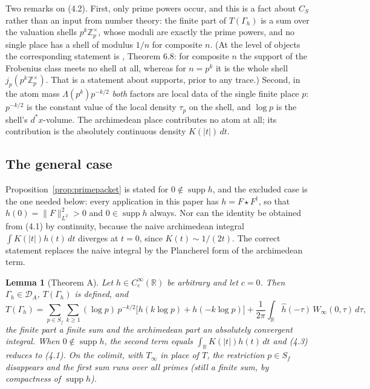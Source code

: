 \documentclass[11pt]{amsart}
\newtheorem{lemma}[theorem]{Lemma}
\theoremstyle{definition}
\theoremstyle{remark}
\newcommand{\R}{\mathbb R}
\newcommand{\Z}{\mathbb Z}
\newcommand{\supp}{\operatorname{supp}}
\newcommand{\DA}{\mathcal D_A}
\newcommand{\CS}{C_S}
\begin{document}
Two remarks on (4.2).  First, only prime powers occur, and this is a fact
about $\CS$ rather than an input from number theory: the finite part of $T(\Gamma_h)$ is a sum over the valuation shells
$p^k\Z_p^\times$, whose moduli are exactly the prime powers, and no single
place has a shell of modulus $1/n$ for composite $n$.  (At the level of
objects the corresponding statement is \cite{P44}, Theorem 6.8: for
composite $n$ the support of the Frobenius class meets no shell at all, whereas
for $n=p^k$ it is the whole shell $j_p(p^k\Z_p^\times)$.  That is a statement
about supports, prior to any trace.)
Second, in the atom mass $\Lambda(p^k)p^{-k/2}$ \emph{both} factors are local
data of the single finite place $p$: $p^{-k/2}$ is the constant value of the
local density $\tau_p$ on the shell, and $\log p$ is the shell's
$d^*x$-volume.  The archimedean place contributes no atom at all; its
contribution is the absolutely continuous density $K(|t|)\,dt$.

\subsection{The general case}

Proposition~\ref{prop:primepacket} is stated for $0\notin\supp h$, and the
excluded case is the one needed below: every application in this
paper has $h=F\star F^\dagger$, so that $h(0)=\|F\|_{L^2}^2>0$ and
$0\in\supp h$ always.  Nor can the identity be obtained from (4.1) by
continuity, because the naive archimedean integral $\int K(|t|)h(t)\,dt$
diverges at $t=0$, since $K(t)\sim1/(2t)$.  The correct statement replaces the
naive integral by the Plancherel form of the archimedean term.

\begin{lemma}[Theorem A]
\label{lem:radial-trace}
Let $h\in C_c^\infty(\R)$ be arbitrary and let $c=0$.  Then $\Gamma_h\in\DA$,
$T(\Gamma_h)$ is defined, and
\begin{equation}
  T(\Gamma_h)=\sum_{p\in S_f}\sum_{k\ge1}(\log p)\,p^{-k/2}
     \bigl[h(k\log p)+h(-k\log p)\bigr]
   +\frac1{2\pi}\int_\R\hat h(-\tau)\,\widehat W_\infty(0,\tau)\,d\tau ,
\tag{4.3}
\end{equation}
the finite part a finite sum and the archimedean part an absolutely convergent
integral.  When $0\notin\supp h$, the second term equals $\int_\R
K(|t|)h(t)\,dt$ and \emph{(4.3)} reduces to \emph{(4.1)}.  On the colimit, with
$T_\infty$ in place of $T$, the restriction $p\in S_f$ disappears and the first
sum runs over all primes (still a finite sum, by compactness of $\supp h$).
\end{lemma}
\end{document}
